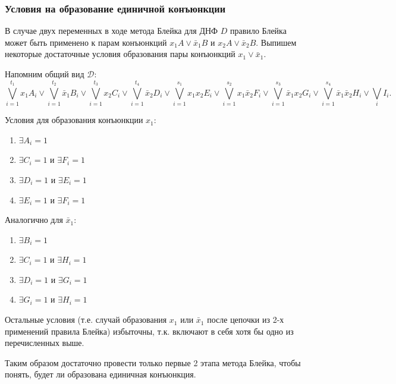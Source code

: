 \documentclass[12pt,a4paper,oneside,fleqn,leqno]{article}
\theoremstyle{definition}
\begin{document}
		\subsubsection*{Условия на образование единичной конъюнкции}
		В случае двух переменных в ходе метода Блейка для ДНФ $D$ правило Блейка может быть применено к парам конъюнкций $x_1A \vee \bar{x}_1B$ и $x_2A \vee \bar{x}_2B.$ Выпишем некоторые достаточные условия образования пары конъюнкций $x_1 \vee \bar{x}_1.$\par
		Напомним общий вид $\mathcal{D}$:
			$$
				\bigvee_{i = 1}^{t_1}x_1A_i \vee \bigvee_{i = 1}^{t_2}\bar{x}_1B_i \vee \bigvee_{i = 1}^{t_3}x_2C_i \vee \bigvee_{i = 1}^{t_4}\bar{x}_2D_i \vee \bigvee_{i = 1}^{s_1}x_1x_2E_i \vee \bigvee_{i = 1}^{s_2}x_1\bar{x}_2F_i \vee \bigvee_{i = 1}^{s_3}\bar{x}_1x_2G_i \vee \bigvee_{i = 1}^{s_4}\bar{x}_1\bar{x}_2H_i \vee \bigvee_iI_i.
			$$\par
		\begin{minipage}[t]{0.5\textwidth}
		Условия для образования конъюнкции $x_1$:
		\begin{enumerate}
			\item
			$\exists A_i = 1$
			\item
			$\exists C_i = 1$ и $\exists F_i = 1$
			\item
			$\exists D_i = 1$ и $\exists E_i = 1$
			\item
			$\exists E_i = 1$ и $\exists F_i = 1$\vspace{10pt}
		\end{enumerate}
		\end{minipage}
		\hfill
		\begin{minipage}[t]{0.4\textwidth}
		Аналогично для $\bar{x}_1$:
		\begin{enumerate}
			\item
			$\exists B_i = 1$
			\item
			$\exists C_i = 1$ и $\exists H_i = 1$
			\item
			$\exists D_i = 1$ и $\exists G_i = 1$
			\item
			$\exists G_i = 1$ и $\exists H_i = 1$
		\end{enumerate}
		\end{minipage}\par
		Остальные условия (т.е. случай образования $x_1$ или $\bar{x}_1$ после цепочки из 2-х применений правила Блейка) избыточны, т.к. включают в себя хотя бы одно из перечисленных выше.\par
		Таким образом достаточно провести только первые 2 этапа метода Блейка, чтобы понять, будет ли образована единичная конъюнкция.
\end{document}
